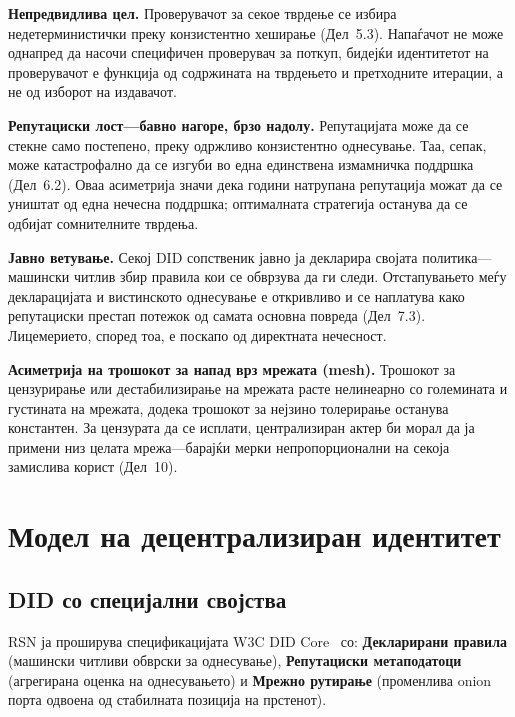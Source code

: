 \documentclass[11pt,a4paper,twocolumn]{article}
\begin{document}
\textbf{Непредвидлива цел.} Проверувачот за секое тврдење се избира недетерминистички преку конзистентно хеширање (Дел~5.3). Напаѓачот не може однапред да насочи специфичен проверувач за поткуп, бидејќи идентитетот на проверувачот е функција од содржината на тврдењето и претходните итерации, а не од изборот на издавачот.

\textbf{Репутациски лост---бавно нагоре, брзо надолу.} Репутацијата може да се стекне само постепено, преку одржливо конзистентно однесување. Таа, сепак, може катастрофално да се изгуби во една единствена измамничка поддршка (Дел~6.2). Оваа асиметрија значи дека години натрупана репутација можат да се уништат од една нечесна поддршка; оптималната стратегија останува да се одбијат сомнителните тврдења.

\textbf{Јавно ветување.} Секој DID сопственик јавно ја декларира својата политика---машински читлив збир правила кои се обврзува да ги следи. Отстапувањето меѓу декларацијата и вистинското однесување е откривливо и се наплатува како репутациски престап потежок од самата основна повреда (Дел~7.3). Лицемерието, според тоа, е поскапо од директната нечесност.

\textbf{Асиметрија на трошокот за напад врз мрежата (mesh).} Трошокот за цензурирање или дестабилизирање на мрежата расте нелинеарно со големината и густината на мрежата, додека трошокот за нејзино толерирање останува константен. За цензурата да се исплати, централизиран актер би морал да ја примени низ целата мрежа---барајќи мерки непропорционални на секоја замислива корист (Дел~10).

\section{Модел на децентрализиран идентитет}

\subsection{DID со специјални својства}

RSN ја проширува спецификацијата W3C DID Core~\cite{did2022} со: \textbf{Декларирани правила} (машински читливи обврски за однесување), \textbf{Репутациски метаподатоци} (агрегирана оценка на однесувањето) и \textbf{Мрежно рутирање} (променлива onion порта одвоена од стабилната позиција на прстенот).
\end{document}
